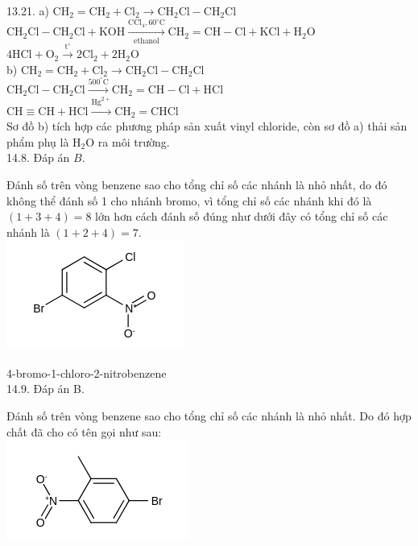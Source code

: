 \documentclass[10pt]{article}
\begin{document}
13.21. a) $\mathrm{CH}_{2}=\mathrm{CH}_{2}+\mathrm{Cl}_{2} \longrightarrow \mathrm{CH}_{2} \mathrm{Cl}-\mathrm{CH}_{2} \mathrm{Cl}$\\
$\mathrm{CH}_{2} \mathrm{Cl}-\mathrm{CH}_{2} \mathrm{Cl}+\mathrm{KOH} \xrightarrow[\text { ethanol }]{\mathrm{CCl}_{4}, 60^{\circ} \mathrm{C}} \mathrm{CH}_{2}=\mathrm{CH}-\mathrm{Cl}+\mathrm{KCl}+\mathrm{H}_{2} \mathrm{O}$\\
$4 \mathrm{HCl}+\mathrm{O}_{2} \xrightarrow{\mathrm{t}^{\circ}} 2 \mathrm{Cl}_{2}+2 \mathrm{H}_{2} \mathrm{O}$\\
b) $\mathrm{CH}_{2}=\mathrm{CH}_{2}+\mathrm{Cl}_{2} \longrightarrow \mathrm{CH}_{2} \mathrm{Cl}-\mathrm{CH}_{2} \mathrm{Cl}$\\
$\mathrm{CH}_{2} \mathrm{Cl}-\mathrm{CH}_{2} \mathrm{Cl} \xrightarrow{500^{\circ} \mathrm{C}} \mathrm{CH}_{2}=\mathrm{CH}-\mathrm{Cl}+\mathrm{HCl}$\\
$\mathrm{CH} \equiv \mathrm{CH}+\mathrm{HCl} \xrightarrow{\mathrm{Hg}^{2+}} \mathrm{CH}_{2}=\mathrm{CHCl}$\\
Sơ đồ b) tích hợp các phương pháp sản xuất vinyl chloride, còn sơ đồ a) thải sản phẩm phụ là $\mathrm{H}_{2} \mathrm{O}$ ra môi trường.\\
14.8. Đáp án $B$.

Đánh số trên vòng benzene sao cho tổng chỉ số các nhánh là nhỏ nhất, do đó không thể đánh số 1 cho nhánh bromo, vì tổng chỉ số các nhánh khi đó là $(1+3+4)=8$ lớn hơn cách đánh số đúng như dưới đây có tổng chỉ số các nhánh là $(1+2+4)=7$.\\
\includegraphics{smile-63794991722ed695334717d0eb213da7daf9d4c4}

4-bromo-1-chloro-2-nitrobenzene\\
14.9. Đáp án B.

Đánh số trên vòng benzene sao cho tổng chỉ số các nhánh là nhỏ nhất. Do đó hợp chất đã cho có tên gọi như sau:\\
\includegraphics{smile-afb0b727b173af823c8d7ca21cbe27b2d272f802}
\end{document}
